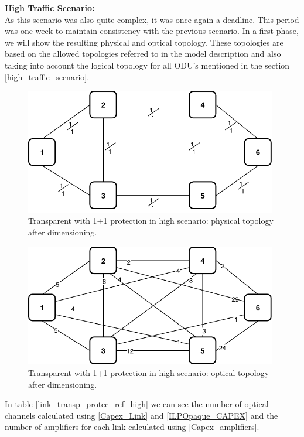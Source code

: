 \textbf{High Traffic Scenario:}\\

As this scenario was also quite complex, it was once again a deadline. This period was one week to maintain consistency with the previous scenario. In a first phase, we will show the resulting physical and optical topology. These topologies are based on the allowed topologies referred to in the model description and also taking into account the logical topology for all ODU's mentioned in the section \ref{high_traffic_scenario}.\\

\begin{figure}[h!]
\centering
\includegraphics[width=11cm]{sdf/ilp/transparent_protection/figures/physical_topology}
\caption{Transparent with 1+1 protection in high scenario: physical topology after dimensioning.}
\label{physical2_protectionhigh}
\end{figure}

\newpage
\begin{figure}[h!]
\centering
\includegraphics[width=11cm]{sdf/ilp/transparent_protection/figures/optical_topology_high}
\caption{Transparent with 1+1 protection in high scenario: optical topology after dimensioning.}
\label{optical2_protectionhigh}
\end{figure}

\vspace{15pt}
In table \ref{link_transp_protec_ref_high} we can see the number of optical channels calculated using \ref{Capex_Link} and \ref{ILPOpaque_CAPEX} and the number of amplifiers for each link calculated using \ref{Capex_amplifiers}.\\

